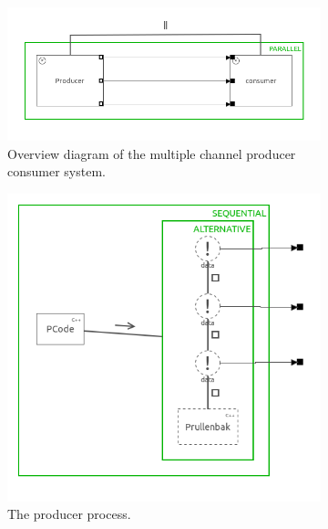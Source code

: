 \documentclass[a4paper,twoside,11pt]{article}
\begin{document}
\begin{figure}
	\centering
	\begin{subfigure}{\textwidth}
	 \centering
	 \includegraphics[scale=0.7]{./images/2-1_overview.png}
	 \caption{Overview diagram of the multiple channel producer consumer system.}
	 \label{fig:2_1-model:overview}
	\end{subfigure}
	\begin{subfigure}{0.5\textwidth}
		\centering
		\includegraphics[width=\textwidth]{./images/2-1_producer.png}
		\caption{The producer process.}
		\label{fig:2_1-model:producer}
	\end{subfigure}%
	\begin{subfigure}{0.5\textwidth}
		\centering

\end{subfigure}
\end{figure}
\end{document}
